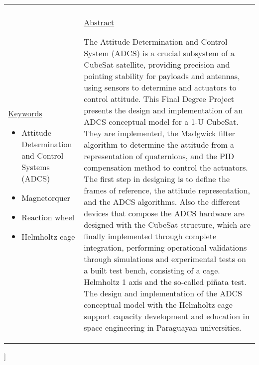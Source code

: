 \begin{@twocolumnfalse}
\begin{tabular}{p{6cm} p{10.3cm}}
			\text{}
			\\
			\uline{Keywords\hfill}
			\begin{itemize}
				\setlength\itemsep{-0.2em}
				\item Attitude Determination and Control Systems (ADCS)
				\item Magnetorquer
				\item Reaction wheel
				\item Helmholtz cage
			\end{itemize} &
			\uline{Abstract \hfill}

			The Attitude Determination and Control System (ADCS) is a crucial subsystem
			of a CubeSat satellite, providing precision and pointing stability for payloads and antennas, using
			sensors to determine and actuators to control attitude. This Final Degree Project presents the
			design and implementation of an ADCS conceptual model for a 1-U CubeSat. They are implemented, the
			Madgwick filter algorithm to determine the attitude from a representation of quaternions, and the
			PID compensation method to control the actuators. The first step in designing is to define the
			frames of reference, the attitude representation, and the ADCS algorithms. Also the different
			devices that compose the ADCS hardware are designed with the CubeSat structure, which are finally
			implemented through complete integration, performing operational validations through simulations
			and experimental tests on a built test bench, consisting of a cage. Helmholtz 1 axis and the
			so-called piñata test. The design and implementation of the ADCS conceptual model with the
			Helmholtz cage support capacity development and education in space engineering in Paraguayan
			universities.

			\\ \hline

		\end{tabular}

	\end{@twocolumnfalse}
]
